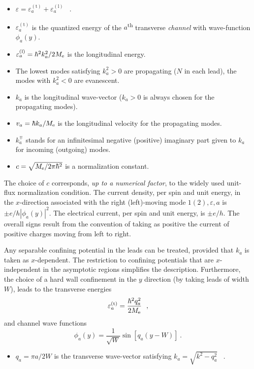\documentclass[a4paper,10pt]{article}
\newcommand{\nin}{\noindent}
\def\Me{M_{\rm e}}
\begin{document}
\begin{itemize}

\item $\varepsilon=\varepsilon^{(\mathrm{t})}_a + \varepsilon^{(\mathrm{l})}_a$ \ .

\item $\varepsilon^{(\mathrm{t})}_a$ is the quantized energy of the $a$\textsuperscript{th} transverse {\it channel} with wave-function $\phi_{a}(y)$.

\item $\varepsilon^{(\mathrm{l})}_a = \hbar^2 k^{2}_{a}/2\Me$ is the longitudinal energy. 

\item The lowest modes satisfying $k_{a}^2 > 0$ are propagating ($N$ in each lead), the modes with $k_{a}^2 < 0$ are evanescent. 

\item $k_{a}$ is the longitudinal wave-vector ($k_{a} > 0$ is always chosen for the propagating modes). 

\item $v_{a}=\hbar k_{a}/\Me$ is the longitudinal velocity for the propagating modes.

\item $k_{a}^\mp$ stands for an infinitesimal negative (positive) imaginary part given to $k_a$ for incoming (outgoing) modes.
 

\item $c=\sqrt{\Me/2\pi \hbar^2}$ is a normalization constant. 

\end{itemize}

\nin The choice of $c$ corresponds, {\it up to a numerical factor}, to the widely used unit-flux normalization condition. The current 
density, per spin and unit energy, in the $x$-direction associated with the 
right (left)-moving mode $1(2),\varepsilon,a$ is $\pm e/h |\phi_{a}(y)|^2$. The electrical current, per spin and unit energy, is $\pm e/h$. The overall signs result from the convention of taking as positive the current of 
positive charges moving from left to right.

\nin Any separable confining potential in the leads can be treated, provided that $k_a$ is taken as $x$-dependent. The restriction to confining potentials that are $x$-independent in the asymptotic regions simplifies the description. Furthermore, the choice of a hard wall confinement in the $y$ direction (by taking leads of width $W$), leads to the transverse energies 
\begin{equation}\label{eq:transverse_energy_lead}
\varepsilon^{(\mathrm{t})}_a = 
\frac{\hbar^2q_a^2 }{2\Me}\ \ ,
\end{equation}
and channel wave functions
\begin{equation}
\label{eq:phi_transv}
\phi_{a}(y) = \frac{1}{\sqrt{W}} 
\sin{\left[q_a(y-W)\right]} \ .
\end{equation}
\begin{itemize}

\item $q_a=\pi a/2W$ is the transverse wave-vector satisfying $k_a=\sqrt{k^2-q_a^2}$ \ .

\end{itemize}
\end{document}
